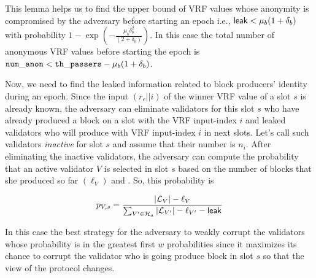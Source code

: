 This lemma helps us to find the upper bound of VRF values whose anonymity is compromised by the adversary before starting an epoch i.e., $ \mathsf{leak} < \mu_b (1+ \delta_b) $ with probability $ 1- \exp(-\frac{\mu_b\delta_b^2}{(2+\delta_b)}) $. In this case the total number of anonymous VRF values before starting the epoch is $  \mathtt{num\_anon} < \mathtt{th\_passers} - \mu_b (1+\delta_b)$.

Now, we need to find the leaked information related to block producers' identity during an epoch.
Since the input $ (r_e||i) $ of the winner VRF value of a slot $ s $ is already known, the adversary can eliminate validators for this slot $ s $ who have already produced a block on a slot with the VRF input-index $ i $ and leaked validators who will produce with VRF input-index $ i $ in next slots. Let's call such validators \emph{inactive} for slot $ s $ and assume that their number is $ n_i $. After eliminating the inactive validators, the adversary can compute the probability that an active validator $ V $ is selected in slot $ s $ based on the number of blocks that she produced so far $ (\ell_V) $ and . So, this probability is


$$p_{V,s} = \frac{|\mathcal{L}_V|- \ell_V}{\sum_{V' \in \mathcal{H}_a}|\mathcal{L}_{V'}| -\ell_{V'}-\mathsf{leak}}$$

In this case the best strategy for the adversary to weakly corrupt the validators whose probability is in the greatest first $ w $ probabilities since it maximizes its chance to corrupt the validator who is going produce block in slot $ s $ so that the view of the protocol changes.



%
%	
%	

